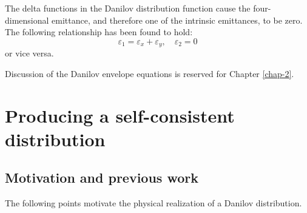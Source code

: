 The delta functions in the Danilov distribution function cause the four-dimensional emittance, and therefore one of the intrinsic emittances, to be zero. The following relationship has been found to hold:
%
\begin{equation}
    \varepsilon_1 = \varepsilon_x + \varepsilon_y, \quad
    \varepsilon_2 = 0
\end{equation}
%
or vice versa. 

Discussion of the Danilov envelope equations is reserved for Chapter \ref{chap-2}.




\section{Producing a self-consistent distribution}\label{sec:Producing a self-consistent distribution}


\subsection{Motivation and previous work}

The following points motivate the physical realization of a Danilov distribution.

